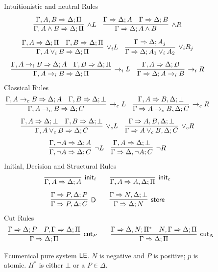 \begin{figure}[htp]
{\sc Intuitionistic and neutral Rules}
$$
\infer[{\wedge L}]{\Seq{\Gamma, A \wedge B}{ \Pi} {\Delta}}{\Seq{\Gamma,
A, B}{ \Pi}{\Delta}} 
\quad
\infer[{\wedge R}]{\Seq{\Gamma}
{A \wedge B}{\Delta}}{\deduce{\Seq{\Gamma} {A}{\Delta}}{} &\deduce{\Seq{\Gamma}{B}{\Delta}}{}} 
$$
$$
\infer[{\vee_i L}]{\Seq{\Gamma, A \vee_i B}{ \Pi}{\Delta}
}{\deduce{\Seq{\Gamma, A}{ \Pi}{\Delta}}{} &\deduce{\Seq{\Gamma,B}{\Pi}{\Delta}}{}} 
\quad
\infer[{\vee_i R_j}]{\Seq{\Gamma}{ A_1\vee_i A_2}{\Delta}}{\Seq{\Gamma}{ A_j}{\Delta}} 
$$
$$
\infer[{\iimp L}]{\Seq{\Gamma, A\iimp B}{
\Pi}{\Delta}}
{\Seq{\Gamma, A\iimp B}{ A}{\Delta} & \Seq{\Gamma , B} 
{\Pi}\Delta} 
\quad
\infer[{\iimp R}]{\Seq{\Gamma}
{A\iimp B}{\Delta}}{\Seq{\Gamma,A}{B}{\Delta}}
$$
{\sc Classical Rules}
$$
\infer[\cimp L]{\Seq{\Gamma, A \rightarrow_c B}{C}{\Delta} }{\Seq{\Gamma, A \rightarrow_c B}{A}{\Delta}&\Seq{\Gamma,  B}{\bot}{\Delta}}
\quad
\infer[\cimp R]{\Seq{\Gamma} {C}{ A\rightarrow_c B,\Delta}}{\Seq{\Gamma, A}{  \bot}{B,\Delta}} 
$$
$$
\infer[\vee_cL]{\Seq{\Gamma,  A \vee_c B}{C}{\Delta}}{\Seq{\Gamma,A}{ \bot}{\Delta} & \Seq{\Gamma,B}{ \bot}{\Delta}} 
\quad
\infer[\vee_cR]{\Seq{\Gamma}{C}{A \vee_c B, \Delta}}{\Seq{\Gamma}{ \bot}{A,B,\Delta}}
$$
$$
\infer[{\neg L}]{\Seq{\Gamma,\neg A}{C}{\Delta}
}{\Seq{\Gamma, \neg A}{  A}{\Delta}}
\quad
\infer[{\neg R}]{\Seq{\Gamma} 
{C}{\Delta,\neg A}}{\Seq{\Gamma,A}{\bot}{\Delta}}
$$
{\sc Initial, Decision and Structural Rules}
$$
\infer[\init_i]{\Seq{\Gamma,A}{A}{\Delta}}{} 
\qquad
\infer[\init_c]{\Seq{\Gamma,A}{\Pi}{A,\Delta}}{} 
$$
$$
\infer[\D]{\Seq{\Gamma}{C}{P,\Delta}}{\Seq{\Gamma}{ P}{P,\Delta}} 
\qquad
\infer[\store]{\Seq{\Gamma}{N}{\Delta}}{\Seq{\Gamma}{ \bot}{N,\Delta}}
$$
{\sc Cut Rules}
$$
\begin{array}{c@{\qquad}c}
\infer[\cut_P]{\Seq{\Gamma}{ \Pi}{\Delta}}{\Seq{\Gamma}{P}{\Delta} & \Seq{P,\Gamma}{ \Pi}{\Delta}} 
&
\infer[\cut_N]{\Seq{\Gamma}{ \Pi}{\Delta}}{\Seq{\Gamma}{ \Pi^*}{\Delta, N} & \Seq{N,\Gamma}{ \Pi}{\Delta}} 
\end{array}
$$
\caption{Ecumenical pure  system $\mathsf{LE}$. $N$ is negative and $P$ is positive; $p$ is atomic.  $\Pi^*$ is either $\bot$ or a $P\in\Delta$.}\label{fig:labEK}
\end{figure}


